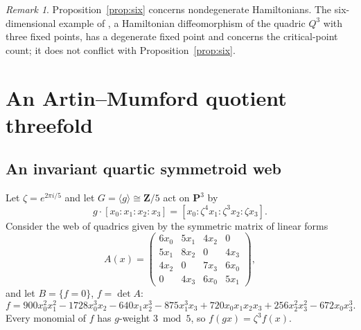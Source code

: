 \documentclass[11pt]{amsart}
\numberwithin{equation}{section}
\theoremstyle{definition}
\theoremstyle{remark}
\newtheorem{remark}[theorem]{Remark}
\newcommand{\Z}{\mathbf Z}
\newcommand{\PP}{\mathbf P}
\begin{document}
\begin{remark}
Proposition~\ref{prop:six} concerns nondegenerate Hamiltonians. The
six-dimensional example of \cite{OpenAIDegenerate}, a Hamiltonian
diffeomorphism of the quadric $Q^3$ with three fixed points, has a
degenerate fixed point and concerns the critical-point count; it does not
conflict with Proposition~\ref{prop:six}.
\end{remark}

\section{An Artin--Mumford quotient threefold}\label{sec:F}

\subsection{An invariant quartic symmetroid web}\label{subsec:web}
Let $\zeta=e^{2\pi i/5}$ and let $G=\langle g\rangle\cong\Z/5$ act on
$\PP^3$ by
\[
  g\cdot[x_0:x_1:x_2:x_3]=[x_0:\zeta^4x_1:\zeta^3x_2:\zeta x_3].
\]
Consider the web of quadrics given by the symmetric matrix of linear forms
\[
  A(x)=\begin{pmatrix}
  6x_0&5x_1&4x_2&0\\
  5x_1&8x_2&0&4x_3\\
  4x_2&0&7x_3&6x_0\\
  0&4x_3&6x_0&5x_1
  \end{pmatrix},
\]
and let $B=\{f=0\}$, $f=\det A$:
\[
  f=900x_0^2x_1^2-1728x_0^3x_2-640x_1x_2^3-875x_1^3x_3+720x_0x_1x_2x_3
  +256x_2^2x_3^2-672x_0x_3^3 .
\]
Every monomial of $f$ has $g$-weight $3\bmod5$, so $f(gx)=\zeta^3f(x)$.
\end{document}
